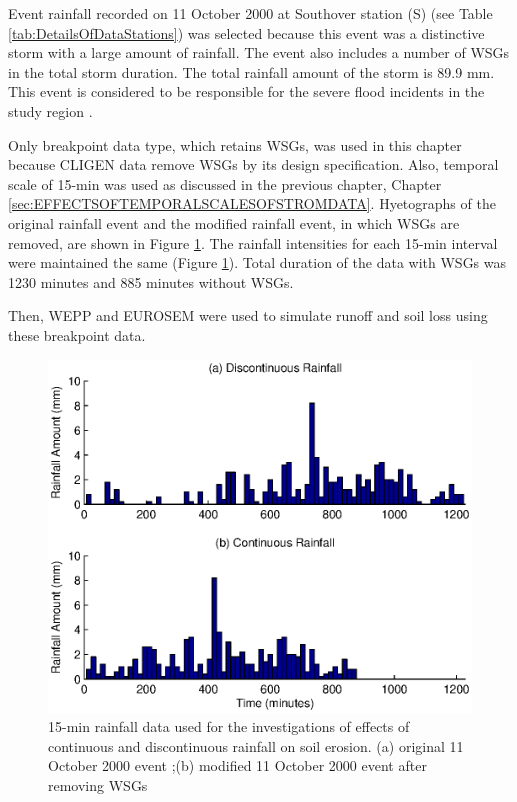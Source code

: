Event rainfall recorded on 11 October 2000 at Southover station (S) (see Table
\ref{tab:DetailsOfDataStations}) was selected because this event was a
distinctive storm with a large amount of rainfall. The event also includes a
number of WSGs in the total storm duration. The total rainfall amount of the
storm is 89.9 mm. This event is considered to be responsible for the severe
flood incidents in the study region \citep{boardman2001-346}.

Only breakpoint data type, which retains WSGs, was used in this chapter because
CLIGEN data remove WSGs by its design specification. Also, temporal scale of
15-min was used as discussed in the previous chapter, Chapter
\ref{sec:EFFECTSOFTEMPORALSCALESOFSTROMDATA}. Hyetographs of the original
rainfall event and the modified rainfall event, in which WSGs are removed, are
shown in Figure \ref{fig:rainfall_discont_cont}. The rainfall intensities for
each 15-min interval were maintained the same (Figure
\ref{fig:rainfall_discont_cont}). Total duration of the data with WSGs was 1230
minutes and 885 minutes without WSGs.

Then, WEPP and EUROSEM were used to simulate runoff and soil loss using these
breakpoint data.

\begin{figure}[tbp]
  \centering
    \includegraphics[width=1.0\textwidth]
{./img/rainfall_discont_cont_input}
  \caption[15-min rainfall data used for the investigations of effects of
continuous and discontinuous rainfall on soil erosion.]{15-min rainfall data
used for the investigations of effects of continuous and discontinuous rainfall
on soil erosion. (a) original 11 October 2000 event ;(b) modified 11 October
2000 event after removing WSGs}
  \label{fig:rainfall_discont_cont}
\end{figure}

